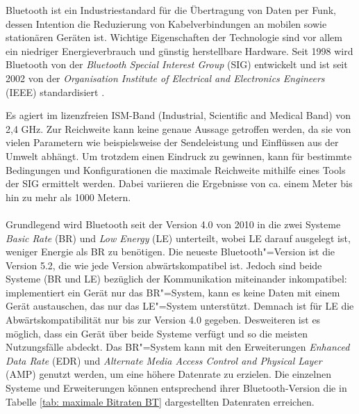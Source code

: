 Bluetooth ist ein Industriestandard für die Übertragung von Daten per Funk, dessen Intention die Reduzierung von Kabelverbindungen an mobilen sowie stationären Geräten ist. Wichtige Eigenschaften der Technologie sind vor allem ein niedriger Energieverbrauch und günstig herstellbare Hardware. Seit 1998 wird Bluetooth von der \textit{Bluetooth Special Interest Group} (SIG) entwickelt und ist seit 2002 von der \textit{Organisation Institute of Electrical and Electronics Engineers} (IEEE) standardisiert \cite{IEEE}.

Es agiert im lizenzfreien ISM-Band (Industrial, Scientific and Medical Band) von 2,4 GHz. 
Zur Reichweite kann keine genaue Aussage getroffen werden, da sie von vielen Parametern wie beispielsweise der Sendeleistung und Einflüssen aus der Umwelt abhängt. Um trotzdem einen Eindruck zu gewinnen, kann für bestimmte Bedingungen und Konfigurationen die maximale Reichweite mithilfe eines Tools \cite{BtRangeTool} der SIG ermittelt werden. Dabei variieren die Ergebnisse von ca. einem Meter bis hin zu mehr als 1000 Metern.
\\\\
Grundlegend wird Bluetooth seit der Version 4.0 von 2010 in die zwei Systeme \textit{Basic Rate} (BR) und \textit{Low Energy} (LE) unterteilt, wobei LE darauf ausgelegt ist, weniger Energie als BR zu benötigen. Die neueste Bluetooth"=Version ist die Version 5.2, die wie jede Version abwärtskompatibel ist. Jedoch sind beide Systeme (BR und LE) bezüglich der Kommunikation miteinander inkompatibel: implementiert ein Gerät nur das BR"=System, kann es keine Daten mit einem Gerät austauschen, das nur das LE"=System unterstützt. Demnach ist für LE die Abwärtskompatibilität nur bis zur Version 4.0 gegeben. Desweiteren ist es möglich, dass ein Gerät über beide Systeme verfügt und so die meisten Nutzungsfälle abdeckt. Das BR"=System kann mit den Erweiterungen \textit{Enhanced Data Rate} (EDR) und \textit{Alternate Media Access Control and Physical Layer} (AMP) genutzt werden, um eine höhere Datenrate zu erzielen. Die einzelnen Systeme und Erweiterungen können entsprechend ihrer Bluetooth-Version die in Tabelle \ref{tab: maximale Bitraten BT} dargestellten Datenraten erreichen.\\

